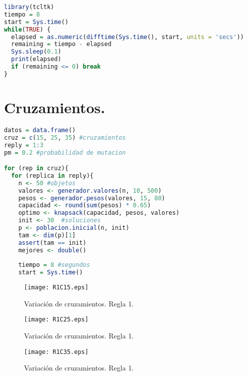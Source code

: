 \documentclass{article}
\begin{document}
\begin{lstlisting}[language=R, caption= Segmento de c\'odigo Timer.]
library(tcltk)
tiempo = 8
start = Sys.time()
while(TRUE) {
  elapsed = as.numeric(difftime(Sys.time(), start, units = 'secs'))
  remaining = tiempo - elapsed
  Sys.sleep(0.1)
  print(elapsed)
  if (remaining <= 0) break
}
\end{lstlisting}
\section{Cruzamientos.}
\begin{lstlisting}[language=R, caption= Segmento de c\'odigo Cruzamientos.]
datos = data.frame()
cruz = c(15, 25, 35) #cruzamientos
reply = 1:3
pm = 0.2 #probabilidad de mutacion

for (rep in cruz){
  for (replica in reply){
    n <- 50 #objetos
    valores <- generador.valores(n, 10, 500)
    pesos <- generador.pesos(valores, 15, 80)
    capacidad <- round(sum(pesos) * 0.65)
    optimo <- knapsack(capacidad, pesos, valores)
    init <- 30  #soluciones
    p <- poblacion.inicial(n, init)
    tam <- dim(p)[1]
    assert(tam == init)
    mejores <- double()
    
    tiempo = 8 #segundos
    start = Sys.time()
\end{lstlisting}

\begin{figure}[htb] %
    \centering
    \texttt{[image: R1C15.eps]} %
    \caption{Variaci\'on de cruzamientos. Regla 1.}
    \label{Figura 1}
\end{figure}
\begin{figure}[htb] %
    \centering
    \texttt{[image: R1C25.eps]} %
    \caption{Variaci\'on de cruzamientos. Regla 1.}
    \label{Figura 2}
\end{figure}
\begin{figure}[htb] %
    \centering
    \texttt{[image: R1C35.eps]} %
    \caption{Variaci\'on de cruzamientos. Regla 1.}
    \label{Figura 3}
\end{figure}
\end{document}
